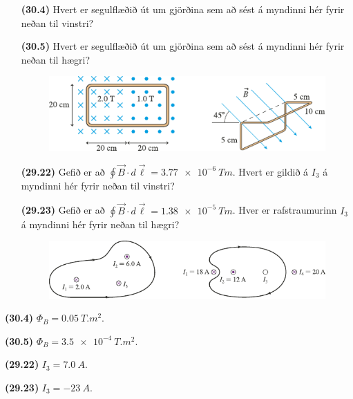 \ifdefined \wholebook \else\documentclass[oneside]{book}\usepackage{EdlBook}\graphicspath{{figures/}}
\begin{document}
\begin{enumerate}[label = \textbf{(\alph*)}]

\item[\textbf{(30.4)}] Hvert er segulflæðið út um gjörðina sem að sést á myndinni hér fyrir neðan til vinstri?

\item[\textbf{(30.5)}]  Hvert er segulflæðið út um gjörðina sem að sést á myndinni hér fyrir neðan til hægri?

\begin{figure}[H]
    \centering
    \includegraphics{figures/rk304.pdf}
\end{figure}


\item[\textbf{(29.22)}] Gefið er að $\displaystyle \oint \vec{B} \cdot d\vec{\ell} = \SI{3.77e-6}{Tm}$. Hvert er gildið á $I_3$ á myndinni hér fyrir neðan til vinstri?

\item[\textbf{(29.23)}] Gefið er að $\displaystyle \oint \vec{B} \cdot d\vec{\ell} = \SI{1.38e-5}{Tm}$. Hver er rafstraumurinn $I_3$ á myndinni hér fyrir neðan til hægri?

\begin{figure}[H]
    \centering
    \includegraphics{figures/rk2922.pdf}
\end{figure}

\end{enumerate}


\begin{tcolorbox}
\begin{enumerate*}[label = ]
  \item \textbf{(30.4)} $\Phi_B = \SI{0.05}{T.m^2}$.
  \item \textbf{(30.5)} $\Phi_B = \SI{3.5e-4}{T.m^2}$.
  \item \textbf{(29.22)} $I_3 = \SI{7.0}{A}$.
  \item \textbf{(29.23)} $I_3 = - \SI{23}{A}$.
\end{enumerate*}
\end{tcolorbox}
\end{document}
